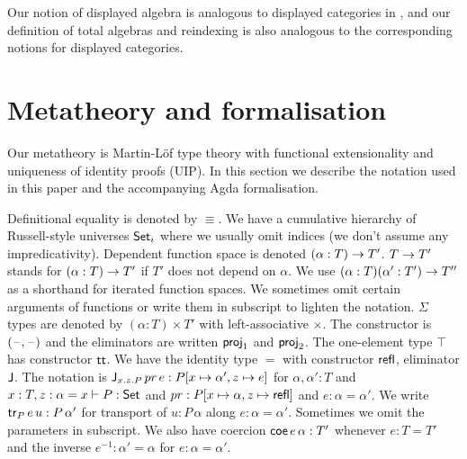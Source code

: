\documentclass[acmsmall,screen]{acmart}
\begin{document}
Our notion of displayed algebra is analogous to displayed categories
in \cite{displayedCategories}, and our definition of total algebras
and reindexing is also analogous to the corresponding notions for
displayed categories.


\section{Metatheory and formalisation}
\label{sec:metatheory}

Our metatheory is Martin-L{\"o}f type theory with functional
extensionality and uniqueness of identity proofs (UIP). In this
section we describe the notation used in this paper and the accompanying
Agda formalisation.

Definitional equality is denoted by $\equiv$. We have a cumulative
hierarchy of Russell-style universes $\Set_i$ where we usually omit
indices (we don't assume any impredicativity). Dependent function
space is denoted $(\alpha:T)\ra T'$. $T\ra T'$ stands for
$(\alpha:T)\ra T'$ if $T'$ does not depend on $\alpha$. We use
$(\alpha:T)(\alpha': T')\ra T''$ as a shorthand for iterated function
spaces. We sometimes omit certain arguments of functions or write them
in subscript to lighten the notation.  $\Sigma$ types are denoted by
$(\alpha:T)\times T'$ with left-associative $\times$. The constructor
is $(\blank,\blank)$ and the eliminators are written $\proj_1$ and
$\proj_2$. The one-element type $\top$ has constructor $\tt$. We have
the identity type $=$ with constructor $\refl$, eliminator $\J$. The
notation is $\J_{x.z.P}\,pr\,e:P[x\mapsto\alpha',z\mapsto e]$ for
$\alpha,\alpha':T$ and $x:T, z:\alpha=x \vdash P:\Set$ and
$pr:P[x\mapsto \alpha,z\mapsto\refl]$ and $e :\alpha=\alpha'$. We
write $\tr_P\,e\,u: P\,\alpha'$ for transport of $u : P\,\alpha$ along
$e :\alpha=\alpha'$. Sometimes we omit the parameters in subscript. We
also have coercion $\coe\,e\,\alpha:T'$ whenever $e:T=T'$ and the
inverse $e^{-1}:\alpha'=\alpha$ for $e:\alpha=\alpha'$.
\end{document}
